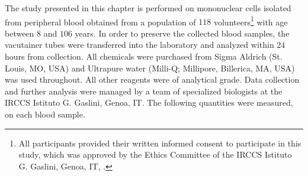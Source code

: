The study presented in this chapter is performed on mononuclear cells isolated from peripheral blood obtained from a population of $118$ volunteers\footnote{ All participants provided their written informed consent to participate in this study, which was approved by the Ethics Committee of the IRCCS Istituto G. Gaslini, Genoa, IT, .} with age between $8$ and $106$ years.
In order to preserve the collected blood samples, the vacutainer tubes were transferred into the laboratory and analyzed within $24$ hours from collection.
All chemicals were purchased from Sigma Aldrich (St. Louis, MO, USA) and Ultrapure water (Milli-Q; Millipore, Billerica, MA, USA) was used throughout. All other reagents were of analytical grade.
Data collection and further analysis were managed by a team of specialized biologists at the IRCCS Istituto G. Gaslini, Genoa, IT. The following quantities were measured, on each blood sample.

